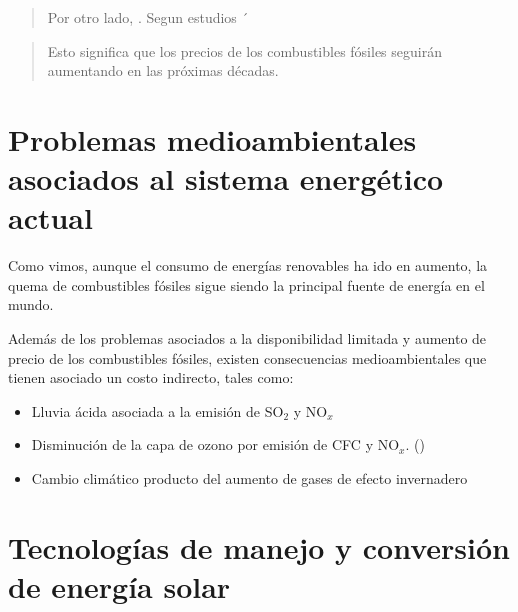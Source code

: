 \documentclass[letterpaper,10pt,english]{jupyterBook}
\begin{document}
\begin{quote}

\sphinxAtStartPar
Por otro lado, . Segun estudios ´
\end{quote}
\begin{quote}

\sphinxAtStartPar
Esto significa que los precios de los combustibles fósiles seguirán aumentando en las próximas décadas.
\end{quote}


\section{Problemas medioambientales asociados al sistema energético actual}
\label{\detokenize{0_introduccion/0_introduccion:problemas-medioambientales-asociados-al-sistema-energetico-actual}}
\sphinxAtStartPar
Como vimos, aunque el consumo de energías renovables ha ido en aumento, la quema de combustibles fósiles sigue siendo la principal fuente de energía en el mundo.

\sphinxAtStartPar
Además de los problemas asociados a la disponibilidad limitada y aumento de precio de los combustibles fósiles, existen consecuencias medioambientales que tienen asociado un costo indirecto, tales como:
\begin{itemize}
\item {} 
\sphinxAtStartPar
Lluvia ácida asociada a la emisión de SO\(_2\) y NO\(_x\)

\item {} 
\sphinxAtStartPar
Disminución de la capa de ozono por emisión de CFC y NO\(_x\). ()

\item {} 
\sphinxAtStartPar
Cambio climático producto del aumento de gases de efecto invernadero

\end{itemize}


\section{Tecnologías de manejo y conversión de energía solar}
\label{\detokenize{0_introduccion/0_introduccion:tecnologias-de-manejo-y-conversion-de-energia-solar}}
\end{document}
